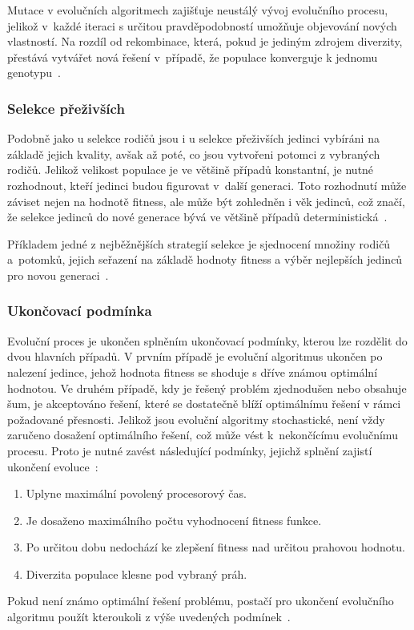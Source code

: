 Mutace v evolučních algoritmech zajišťuje neustálý vývoj evolučního procesu, jelikož v~každé iteraci s určitou pravděpodobností umožňuje objevování nových vlastností. 
Na rozdíl od rekombinace, která, pokud je jediným zdrojem diverzity, přestává vytvářet nová řešení v~případě, že populace konverguje k jednomu genotypu~\cite{NaturalComputing}. 

\subsubsection*{Selekce přeživších}
Podobně jako u selekce rodičů jsou i u selekce přeživších jedinci vybíráni na základě jejich kvality, avšak až poté, co jsou vytvořeni potomci z vybraných rodičů. 
Jelikož velikost populace je ve většině případů konstantní, je nutné rozhodnout, kteří jedinci budou figurovat v~další generaci. 
Toto rozhodnutí může záviset nejen na hodnotě fitness, ale může být zohledněn i věk jedinců, což značí, že selekce jedinců do nové generace bývá ve většině případů deterministická~\cite{IntroductionToEvoComputing}. 

Příkladem jedné z nejběžnějších strategií selekce je sjednocení množiny rodičů a~potomků, jejich seřazení na základě hodnoty fitness a výběr nejlepších jedinců pro novou generaci~\cite{IntroductionToEvoComputing}. 

\subsubsection*{Ukončovací podmínka}
Evoluční proces je ukončen splněním ukončovací podmínky, kterou lze rozdělit do dvou hlavních případů. 
V prvním případě je evoluční algoritmus ukončen po nalezení jedince, jehož hodnota fitness se shoduje s dříve známou optimální hodnotou. 
Ve druhém případě, kdy je řešený problém zjednodušen nebo obsahuje šum, je akceptováno řešení, které se dostatečně blíží optimálnímu řešení v rámci požadované přesnosti. 
Jelikož jsou evoluční algoritmy stochastické, není vždy zaručeno dosažení optimálního řešení, což může vést k~nekončícímu evolučnímu procesu.
Proto je nutné zavést následující podmínky, jejichž splnění zajistí ukončení evoluce~\cite{IntroductionToEvoComputing}:
\begin{enumerate}
    \item Uplyne maximální povolený procesorový čas. 
    \item Je dosaženo maximálního počtu vyhodnocení fitness funkce. 
    \item Po určitou dobu nedochází ke zlepšení fitness nad určitou prahovou hodnotu. 
    \item Diverzita populace klesne pod vybraný práh. 
\end{enumerate}
Pokud není známo optimální řešení problému, postačí pro ukončení evolučního algoritmu použít kteroukoli z výše uvedených podmínek~\cite{IntroductionToEvoComputing}. 

